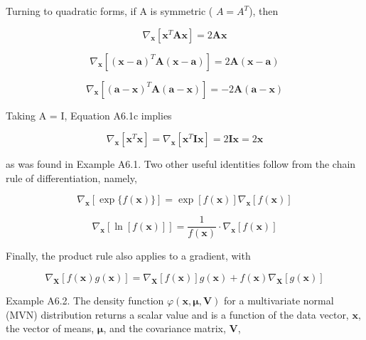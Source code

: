 \documentclass{article}
\begin{document}
Turning to quadratic forms, if A is symmetric ( $ A = A^{T} $), then

\begin{equation}
\nabla_{\mathbf{x}}\left[\mathbf{x}^{T}\mathbf{A}\mathbf{x}\right]=2\mathbf{A}\mathbf{x}
\end{equation}

\begin{equation}
\nabla_{\mathbf{x}}\left[\left(\mathbf{x}-\mathbf{a}\right)^{T}\mathbf{A}(\mathbf{x}-\mathbf{a})\right]=2\mathbf{A}(\mathbf{x}-\mathbf{a})
\end{equation}

\begin{equation}
\nabla_{\mathbf{x}}\left[\left(\mathbf{a}-\mathbf{x}\right)^{T}\mathbf{A}(\mathbf{a}-\mathbf{x})\right]=-2\mathbf{A}(\mathbf{a}-\mathbf{x})
\end{equation}

Taking A = I, Equation A6.1c implies

\begin{equation}
\nabla_{\mathbf{x}}\left[\mathbf{x}^{T}\mathbf{x}\right]=\nabla_{\mathbf{x}}\left[\mathbf{x}^{T}\mathbf{I}\mathbf{x}\right]=2\mathbf{I}\mathbf{x}=2\mathbf{x}
\end{equation}

as was found in Example A6.1. Two other useful identities follow from the chain rule of differentiation, namely,

\begin{equation}
\nabla_{\mathbf{x}}\left[\exp\{f(\mathbf{x})\}\right]=\exp[f(\mathbf{x})]\nabla_{\mathbf{x}}\left[f(\mathbf{x})\right]
\end{equation}

\begin{equation}
\nabla_{\mathbf{x}}\left[\ln[f(\mathbf{x})]\right]=\frac{1}{f(\mathbf{x})}\cdot\nabla_{\mathbf{x}}\left[f(\mathbf{x})\right]
\end{equation}

Finally, the product rule also applies to a gradient, with

\begin{equation}
\nabla_{\mathbf{X}}\left[f(\mathbf{x})g(\mathbf{x})\right]=\nabla_{\mathbf{X}}\left[f(\mathbf{x})\right]g(\mathbf{x})+f(\mathbf{x})\nabla_{\mathbf{X}}\left[g(\mathbf{x})\right]
\end{equation}

Example A6.2. The density function  $ \varphi(\mathbf{x}, \boldsymbol{\mu}, \mathbf{V}) $ for a multivariate normal (MVN) distribution returns a scalar value and is a function of the data vector,  $ \mathbf{x} $, the vector of means,  $ \boldsymbol{\mu} $, and the covariance matrix,  $ \mathbf{V} $,
\end{document}
